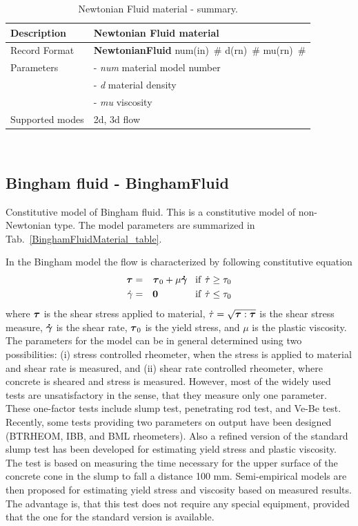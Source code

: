 \documentclass[a4paper]{article}
\newcommand{\mbf}[1]{\mbox{\boldmath$#1$}}
\newcommand{\descitem}[1]{{\noindent \bf #1}}
\newcommand{\elemparam}[2]{{{#1\tiny (#2)}~\#}}
\newcommand{\param}[1]{{\it #1}}
\newenvironment{mmt}{\begin{tabular}{|l|p{9cm}|}}{\end{tabular}\\}
\newenvironment{mmt}{\begin{tabular}{|l|l|}}{\end{tabular}\\}
\begin{document}
\begin{table}[!htb]
\begin{mmt}
\hline
Description & Newtonian Fluid material\\
\hline
Record Format & \descitem{NewtonianFluid} \elemparam{num}{in}
\elemparam{d}{rn} \elemparam{mu}{rn}\\
Parameters &- \param{num} material model number\\
&- \param{d} material density\\
&- \param{mu} viscosity\\
Supported modes& 2d, 3d flow\\
\hline
\end{mmt}
\caption{Newtonian Fluid material - summary.}
\label{NewtonianFluidMaterial_table}
\end{table}



\subsection{Bingham fluid - BinghamFluid}
\label{BinghamFluidMaterial}
Constitutive model of Bingham fluid. This is a constitutive model of
non-Newtonian type. The model parameters are summarized
in Tab.~\ref{BinghamFluidMaterial_table}.

In the Bingham model the flow is characterized by following
constitutive equation
\begin{eqnarray}
  \label{eq:bigham-model}
  \mbf{\tau}&=&\mbf{\tau}_0+\mu\mbf{\dot\gamma}\;\;\;\rm{if}\
  \dot\tau\ge\tau_0\\
  \dot\gamma &=& \mbf{0}\;\;\;\;\;\;\;\;\;\;\;\;\;\;\rm{if}\ \dot\tau\le\tau_0
\end{eqnarray}
where $\mbf{\tau}$ is the shear stress applied to material, $\dot\tau=\sqrt{\mbf{\tau}:\mbf{\tau}}$
is the shear stress measure, $\mbf{\dot\gamma}$ is
the shear rate, $\mbf{\tau}_0$ is the yield stress, and $\mu$ is the plastic
viscosity.
The parameters for the model can be in general determined using two
possibilities: (i) stress controlled rheometer, when the stress is applied
to material and shear rate is measured, and (ii) shear rate controlled
rheometer, where concrete is sheared and stress is measured. However,
most of the widely used tests are unsatisfactory in the sense, that
they measure only one parameter. These one-factor tests include slump
test, penetrating rod test, and Ve-Be test. Recently, some tests
providing two parameters on output have been designed (BTRHEOM, IBB,
and BML rheometers). Also a refined version of the
standard slump test has been developed for estimating yield stress and
plastic viscosity. The test is based on measuring the time necessary
for the upper surface of the concrete cone in the slump to fall a
distance 100 mm. Semi-empirical models are then proposed for estimating
yield stress and viscosity based on measured results. The advantage
is, that this test does not require any special equipment, provided that
the one for the standard version is available.
\end{document}
